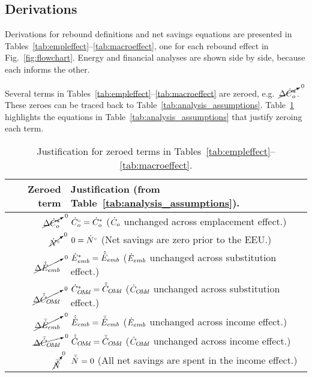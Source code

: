 


\subsection{Derivations}
\label{sec:derivations}

Derivations for rebound definitions and net savings equations
are presented in Tables~\ref{tab:empleffect}--\ref{tab:macroeffect},
one for each rebound effect in Fig.~\ref{fig:flowchart}.
Energy and financial analyses are shown side by side, because
each informs the other.

Several terms in Tables~\ref{tab:empleffect}--\ref{tab:macroeffect}
are zeroed, e.g.\ $\cancelto{0}{\Delta {\dot{C}}^*_o}$. 
These zeroes can be traced back to Table~\ref{tab:analysis_assumptions}.
Table~\ref{tab:zeroed_terms} highlights the equations
in Table~\ref{tab:analysis_assumptions}
that justify zeroing each term.

\begin{table}
\footnotesize
\centering %
\caption{Justification for zeroed terms in Tables~\ref{tab:empleffect}--\ref{tab:macroeffect}.}
\begin{tabular}{r l}
  \toprule
  Zeroed term & Justification (from Table~\ref{tab:analysis_assumptions}). \\
  \midrule
  $\cancelto{0}{\Delta {\dot{C}}^*_o}$    & ${}{\dot{C}}^{\scriptscriptstyle \circ}_o = {\dot{C}}^*_o$ ($\dot{C}_o$ unchanged across emplacement effect.) \\
  $\cancelto{0}{{}{\dot{N}}^{\scriptscriptstyle \circ}}$              & $0 = {}{\dot{N}}^{\scriptscriptstyle \circ}$ (Net savings are zero prior to the EEU.) \\
  $\cancelto{0}{\Delta \hat{\dot{E}}_{emb}}$ & ${\dot{E}}^*_{emb} = \hat{\dot{E}}_{emb}$ ($\dot{E}_{emb}$ unchanged across substitution effect.) \\
  $\cancelto{0}{\Delta \hat{\dot{C}}_{O\!M\!d}}$ & ${\dot{C}}^*_{O\!M\!d} = \hat{\dot{C}}_{O\!M\!d}$ ($\dot{C}_{O\!M\!d}$ unchanged across substitution effect.) \\
  $\cancelto{0}{\Delta \bar{\dot{E}}_{emb}}$ & $\hat{\dot{E}}_{emb} = \bar{\dot{E}}_{emb}$ ($\dot{E}_{emb}$ unchanged across income effect.) \\
  $\cancelto{0}{\Delta \bar{\dot{C}}_{O\!M\!d}}$ & $\hat{\dot{C}}_{O\!M\!d} = \bar{\dot{C}}_{O\!M\!d}$ ($\dot{C}_{O\!M\!d}$ unchanged across income effect.) \\
  $\cancelto{0}{\bar{\dot{N}}}$              & $\bar{\dot{N}} = 0$ (All net savings are spent in the income effect.) \\
  \bottomrule
\end{tabular}
\label{tab:zeroed_terms}
\end{table}



